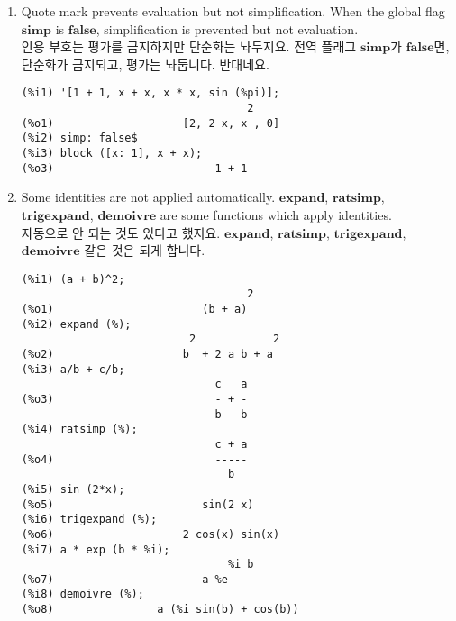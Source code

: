 \documentclass[12pt]{article}
\begin{document}
\begin{enumerate}

\item Quote mark prevents evaluation but not simplification.
When the global flag $\mathbf{simp}$ is $\mathbf{false}$,
simplification is prevented but not evaluation. \\

인용 부호는 평가를 금지하지만 단순화는 놔두지요. 전역 플래그 $\mathbf{simp}$가 $\mathbf{false}$면, 단순화가 금지되고, 평가는 놔둡니다. 반대네요.


\begin{verbatim}
(%i1) '[1 + 1, x + x, x * x, sin (%pi)];
                                   2
(%o1)                    [2, 2 x, x , 0]
(%i2) simp: false$ 
(%i3) block ([x: 1], x + x);
(%o3)                         1 + 1
\end{verbatim}

\item Some identities are not applied automatically.
$\mathbf{expand}$, $\mathbf{ratsimp}$, $\mathbf{trigexpand}$, $\mathbf{demoivre}$
are some functions which apply identities. \\

자동으로 안 되는 것도 있다고 했지요. $\mathbf{expand}$, $\mathbf{ratsimp}$, $\mathbf{trigexpand}$, $\mathbf{demoivre}$ 같은 것은 되게 합니다.


\begin{verbatim}
(%i1) (a + b)^2;
                                   2
(%o1)                       (b + a)
(%i2) expand (%);
                          2            2
(%o2)                    b  + 2 a b + a
(%i3) a/b + c/b;
                              c   a
(%o3)                         - + -
                              b   b
(%i4) ratsimp (%);
                              c + a
(%o4)                         -----
                                b
(%i5) sin (2*x);
(%o5)                       sin(2 x)
(%i6) trigexpand (%);
(%o6)                    2 cos(x) sin(x)
(%i7) a * exp (b * %i);
                                %i b
(%o7)                       a %e
(%i8) demoivre (%);
(%o8)                a (%i sin(b) + cos(b))
\end{verbatim}

\end{enumerate}
\end{document}
